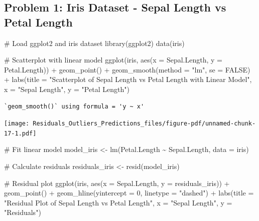 \documentclass[
  letterpaper,
  DIV=11,
  numbers=noendperiod]{scrreprt}
\newenvironment{Shaded}{\begin{snugshade}}{\end{snugshade}}
\newcommand{\AttributeTok}[1]{\textcolor[rgb]{0.40,0.45,0.13}{#1}}
\newcommand{\CommentTok}[1]{\textcolor[rgb]{0.37,0.37,0.37}{#1}}
\newcommand{\ConstantTok}[1]{\textcolor[rgb]{0.56,0.35,0.01}{#1}}
\newcommand{\DecValTok}[1]{\textcolor[rgb]{0.68,0.00,0.00}{#1}}
\newcommand{\FunctionTok}[1]{\textcolor[rgb]{0.28,0.35,0.67}{#1}}
\newcommand{\NormalTok}[1]{\textcolor[rgb]{0.00,0.23,0.31}{#1}}
\newcommand{\OtherTok}[1]{\textcolor[rgb]{0.00,0.23,0.31}{#1}}
\newcommand{\SpecialCharTok}[1]{\textcolor[rgb]{0.37,0.37,0.37}{#1}}
\newcommand{\StringTok}[1]{\textcolor[rgb]{0.13,0.47,0.30}{#1}}
\begin{document}
\subsection*{Problem 1: Iris Dataset - Sepal Length vs Petal
Length}\label{problem-1-iris-dataset---sepal-length-vs-petal-length-2}

\begin{Shaded}
\begin{Highlighting}[]
\CommentTok{\# Load ggplot2 and iris dataset}
\FunctionTok{library}\NormalTok{(ggplot2)}
\FunctionTok{data}\NormalTok{(iris)}

\CommentTok{\# Scatterplot with linear model}
\FunctionTok{ggplot}\NormalTok{(iris, }\FunctionTok{aes}\NormalTok{(}\AttributeTok{x =}\NormalTok{ Sepal.Length, }\AttributeTok{y =}\NormalTok{ Petal.Length)) }\SpecialCharTok{+}
  \FunctionTok{geom\_point}\NormalTok{() }\SpecialCharTok{+}
  \FunctionTok{geom\_smooth}\NormalTok{(}\AttributeTok{method =} \StringTok{"lm"}\NormalTok{, }\AttributeTok{se =} \ConstantTok{FALSE}\NormalTok{) }\SpecialCharTok{+}
  \FunctionTok{labs}\NormalTok{(}\AttributeTok{title =} \StringTok{"Scatterplot of Sepal Length vs Petal Length with Linear Model"}\NormalTok{, }\AttributeTok{x =} \StringTok{"Sepal Length"}\NormalTok{, }\AttributeTok{y =} \StringTok{"Petal Length"}\NormalTok{)}
\end{Highlighting}
\end{Shaded}

\begin{verbatim}
`geom_smooth()` using formula = 'y ~ x'
\end{verbatim}

\texttt{[image: Residuals\_Outliers\_Predictions\_files/figure-pdf/unnamed-chunk-17-1.pdf]}

\begin{Shaded}
\begin{Highlighting}[]
\CommentTok{\# Fit linear model}
\NormalTok{model\_iris }\OtherTok{\textless{}{-}} \FunctionTok{lm}\NormalTok{(Petal.Length }\SpecialCharTok{\textasciitilde{}}\NormalTok{ Sepal.Length, }\AttributeTok{data =}\NormalTok{ iris)}

\CommentTok{\# Calculate residuals}
\NormalTok{residuals\_iris }\OtherTok{\textless{}{-}} \FunctionTok{resid}\NormalTok{(model\_iris)}

\CommentTok{\# Residual plot}
\FunctionTok{ggplot}\NormalTok{(iris, }\FunctionTok{aes}\NormalTok{(}\AttributeTok{x =}\NormalTok{ Sepal.Length, }\AttributeTok{y =}\NormalTok{ residuals\_iris)) }\SpecialCharTok{+}
  \FunctionTok{geom\_point}\NormalTok{() }\SpecialCharTok{+}
  \FunctionTok{geom\_hline}\NormalTok{(}\AttributeTok{yintercept =} \DecValTok{0}\NormalTok{, }\AttributeTok{linetype =} \StringTok{"dashed"}\NormalTok{) }\SpecialCharTok{+}
  \FunctionTok{labs}\NormalTok{(}\AttributeTok{title =} \StringTok{"Residual Plot of Sepal Length vs Petal Length"}\NormalTok{, }\AttributeTok{x =} \StringTok{"Sepal Length"}\NormalTok{, }\AttributeTok{y =} \StringTok{"Residuals"}\NormalTok{)}
\end{Highlighting}
\end{Shaded}
\end{document}
